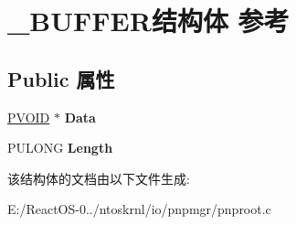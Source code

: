\hypertarget{struct___b_u_f_f_e_r}{}\section{\+\_\+\+B\+U\+F\+F\+E\+R结构体 参考}
\label{struct___b_u_f_f_e_r}
\subsection*{Public 属性}
\begin{DoxyCompactItemize}
\item 
\mbox{\label{struct___b_u_f_f_e_r_a236fe966b79d254b7be897f0645ea05a}} 
\hyperlink{interfacevoid}{P\+V\+O\+ID} $\ast$ {\bfseries Data}
\item 
\mbox{\label{struct___b_u_f_f_e_r_acdba0a5f2d674afd70bcd1a7cda9ce90}} 
P\+U\+L\+O\+NG {\bfseries Length}
\end{DoxyCompactItemize}


该结构体的文档由以下文件生成\+:\begin{DoxyCompactItemize}
\item 
E\+:/\+React\+O\+S-\/0../ntoskrnl/io/pnpmgr/pnproot.\+c\end{DoxyCompactItemize}
